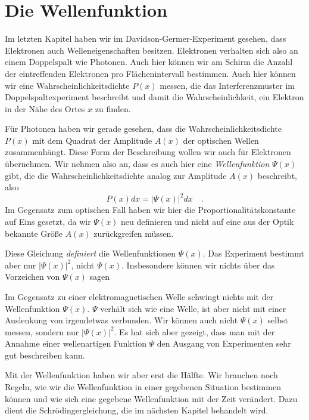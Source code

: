 \section{Die Wellenfunktion}

Im letzten Kapitel haben wir im Davidson-Germer-Experiment gesehen, dass Elektronen auch Welleneigenschaften besitzen. Elektronen verhalten sich also an einem Doppelspalt wie Photonen. Auch hier können wir am Schirm die Anzahl der eintreffenden Elektronen pro Flächenintervall bestimmen. Auch hier können wir eine Wahrscheinlichkeitsdichte $P(x)$ messen, die das Interferenzmuster im Doppelspaltexperiment beschreibt und damit die Wahrscheinlichkeit, ein Elektron in der Nähe des Ortes $x$ zu finden.

Für Photonen haben wir gerade gesehen, dass die Wahrscheinlichkeitsdichte $P(x)$ mit dem Quadrat der Amplitude $A(x)$ der optischen Wellen zusammenhängt. Diese Form der Beschreibung wollen wir auch für Elektronen übernehmen. Wir nehmen also an, dass es auch hier eine \emph{Wellenfunktion} $\Psi(x)$ gibt, die die Wahrscheinlichkeitsdichte analog zur Amplitude $A(x)$ beschreibt, also
\begin{equation}
    P(x) dx  = |\Psi(x)|^2 dx \quad .
\end{equation}
Im Gegensatz zum optischen Fall haben wir hier die Proportionalitätskonstante auf Eins gesetzt, da wir $\Psi(x)$ neu definieren und nicht auf eine aus der Optik bekannte Größe $A(x)$ zurückgreifen müssen.

Diese Gleichung \emph{definiert} die Wellenfunktionen $\Psi(x)$. Das Experiment bestimmt aber nur $|\Psi(x)|^2$, nicht $\Psi(x)$. Insbesondere können wir nichts über das Vorzeichen von $\Psi(x)$ sagen

Im Gegensatz zu einer elektromagnetischen Welle schwingt nichts mit der Wellenfunktion $\Psi(x)$.  $\Psi$ verhält sich wie eine Welle, ist aber nicht mit einer Auslenkung von irgendetwas verbunden. Wir können auch nicht $\Psi(x)$ selbst messen, sondern nur $|\Psi(x)|^2$. Es hat sich aber gezeigt, dass man mit der Annahme einer wellenartigen Funktion $\Psi$ den Ausgang von Experimenten sehr gut beschreiben kann. 

Mit der Wellenfunktion haben wir aber erst die Hälfte. Wir brauchen noch Regeln, wie wir die Wellenfunktion in einer gegebenen Situation bestimmen können und wie sich eine gegebene Wellenfunktion mit der Zeit verändert. Dazu dient die Schrödingergleichung, die im nächsten Kapitel behandelt wird.

